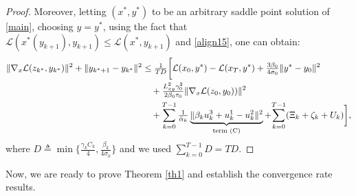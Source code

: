 \documentclass[letterpaper,11 pt]{article}
\def\ml{\mathcal L}
\newcommand{\mb}[1]{{\color{black}#1}}
\begin{document}
\begin{proof}
Moreover, letting $(x^*,y^*)$ to be an arbitrary saddle point solution of \eqref{main}, choosing $y=y^*$, using the fact that $\ml(x^\ast{(y_{k+1})},y_{k+1}) \leq \ml(x^*,y_{k+1})$ and \eqref{align15}, one can obtain:
\begin{align}
  \nonumber\|\nabla_x \ml(z_{k^*},y_{k^*})\|^2+\|y_{k^*+1}-y_{k^*}\|^2&\leq \nonumber \tfrac{1}{TD}\biggr[ \ml(x_0,y^*)-\ml(x_T,y^*) +\tfrac{3\beta_0}{4\sigma_0}\|y^*-y_0\|^2\\\nonumber
  &\quad + \tfrac{{L^2_{xy}}\gamma_0^2}{2\beta_0\tau_0}\|\nabla_x \ml(z_0,y_0))\|^2\\\nonumber
  &\quad+\sum_{k=0}^{T-1}\tfrac{1}{\bar \alpha_k} \underbrace{\|\beta_k u_k^3+u_k^1-u_k^2\|^2}_{\text{term (C)}}+\mb{\sum_{k=0}^{T-1}(\Xi_k+\zeta_k+U_k)}\biggr],
\end{align}
where $D\triangleq {\min \{{\tfrac{{\gamma_k C_k}}{4}, \tfrac{\beta_k}{{4\sigma_k}}}}\}$ and we used ${\sum_{k=0}^{T-1}D}=TD$. 
\end{proof}
Now, we are ready to prove Theorem \ref{th1} and establish the convergence rate results.
\end{document}

